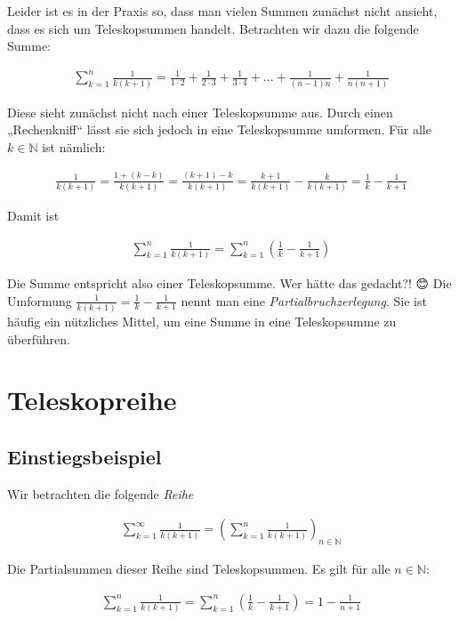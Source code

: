 \documentclass[fontsize=9pt,
               parskip=half-,
               DIV=14,
               listof=chapterentry,
               tocflat]{scrbook}
\begin{document}
Leider ist es in der Praxis so, dass man vielen Summen zunächst nicht ansieht, dass es sich um Teleskopsummen handelt. Betrachten wir dazu die folgende Summe:

\begin{align*}
\sum _{k=1}^{n}{\frac {1}{k(k+1)}}={\frac {1}{1\cdot 2}}+{\frac {1}{2\cdot 3}}+{\frac {1}{3\cdot 4}}+\ldots +{\frac {1}{(n-1)n}}+{\frac {1}{n(n+1)}}
\end{align*}

Diese sieht zunächst nicht nach einer Teleskopsumme aus. Durch einen „Rechenkniff“ lässt sie sich jedoch in eine Teleskopsumme umformen. Für alle $k\in \mathbb {N} $ ist nämlich:

\begin{align*}
{\frac {1}{k(k+1)}}={\frac {1+(k-k)}{k(k+1)}}={\frac {(k+1)-k}{k(k+1)}}={\frac {k+1}{k(k+1)}}-{\frac {k}{k(k+1)}}={\frac {1}{k}}-{\frac {1}{k+1}}
\end{align*}

Damit ist

\begin{align*}
\sum _{k=1}^{n}{\frac {1}{k(k+1)}}=\sum _{k=1}^{n}\left({\frac {1}{k}}-{\frac {1}{k+1}}\right)
\end{align*}

Die Summe entspricht also einer Teleskopsumme. Wer hätte das gedacht?! {\DejaSans 😊} Die Umformung ${\tfrac {1}{k(k+1)}}={\tfrac {1}{k}}-{\tfrac {1}{k+1}}$ nennt man eine \emph{Partialbruchzerlegung}. Sie ist häufig ein nützliches Mittel, um eine Summe in eine Teleskopsumme zu überführen.

\section{Teleskopreihe}

\subsection{Einstiegsbeispiel}

Wir betrachten die folgende \emph{Reihe}

\begin{align*}
\sum _{k=1}^{\infty }{\frac {1}{k(k+1)}}=\left(\sum _{k=1}^{n}{\frac {1}{k(k+1)}}\right)_{n\in \mathbb {N} }
\end{align*}

Die Partialsummen dieser Reihe sind Teleskopsummen. Es gilt für alle $n\in \mathbb {N} $:

\begin{align*}
\sum _{k=1}^{n}{\frac {1}{k(k+1)}}=\sum _{k=1}^{n}\left({\frac {1}{k}}-{\frac {1}{k+1}}\right)=1-{\frac {1}{n+1}}
\end{align*}
\end{document}
